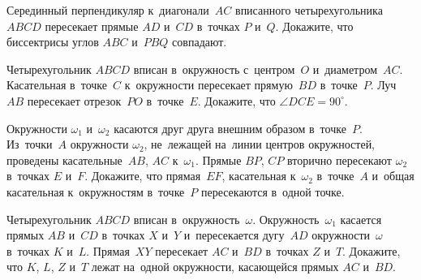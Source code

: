 \begin{problems}
\item
Серединный перпендикуляр к~диагонали~$AC$ вписанного четырехугольника
$ABCD$ пересекает прямые $AD$ и~$CD$ в~точках $P$ и~$Q$.
Докажите, что биссектрисы углов $ABC$ и~$PBQ$ совпадают.

\item
Четырехугольник $ABCD$ вписан в~окружность с~центром~$O$ и~диаметром~$AC$.
Касательная в~точке~$C$ к~окружности пересекает прямую~$BD$ в~точке~$P$.
Луч~$AB$ пересекает отрезок~$PO$ в~точке~$E$.
Докажите, что $\angle DCE = 90^{\circ}$.

\item
Окружности $\omega_1$ и~$\omega_2$ касаются друг друга внешним образом
в~точке~$P$.
Из~точки~$A$ окружности $\omega_2$, не~лежащей на~линии центров окружностей,
проведены касательные~$AB$, $AC$ к~$\omega_1$.
Прямые $BP$, $CP$ вторично пересекают $\omega_2$ в~точках $E$ и~$F$.
Докажите, что прямая~$EF$, касательная к~$\omega_2$ в~точке~$A$ и~общая
касательная к~окружностям в~точке~$P$ пересекаются в~одной точке.

\item
Четырехугольник $ABCD$ вписан в~окружность~$\omega$.
Окружность~$\omega_1$ касается прямых $AB$ и~$CD$ в~точках $X$ и~$Y$
и~пересекается дугу~$AD$ окружности~$\omega$ в~точках $K$ и~$L$.
Прямая~$XY$ пересекает $AC$ и~$BD$ в~точках $Z$ и~$T$.
Докажите, что $K$, $L$, $Z$ и~$T$ лежат на~одной окружности, касающейся
прямых $AC$ и~$BD$.

\end{problems}

